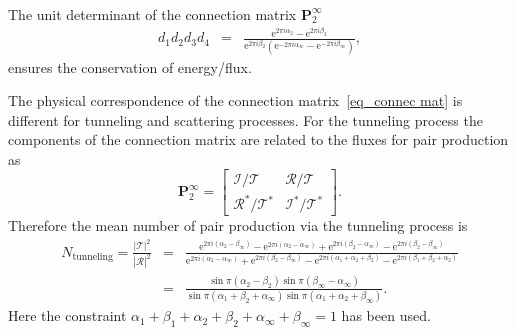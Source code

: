 \documentclass[aps,nofootinbib,superscriptaddress
]{revtex4}
\begin{document}
\begin{appendix}
\begin{eqnarray}
\end{eqnarray}
The unit determinant of the connection matrix $\mathbf{P}_2^\infty$
\begin{eqnarray}
d_1 d_2 d_3 d_4
&=& \frac{\mathrm{e}^{2 \pi i \alpha_2} - \mathrm{e}^{2 \pi i \beta_2}}{\mathrm{e}^{2 \pi i \beta_2} \left( \mathrm{e}^{- 2 \pi i \alpha_\infty} - \mathrm{e}^{- 2 \pi i \beta_\infty} \right)},
\end{eqnarray}
ensures the conservation of energy/flux.


The physical correspondence of the connection matrix~\eqref{eq_connec mat} is different for tunneling and scattering processes. For the tunneling process the components of the connection matrix are related to the fluxes for pair production as~\cite{Chen:2022hpe}
\begin{equation}
\mathbf{P}_2^\infty = \begin{bmatrix} \mathcal{I}/\mathcal{T} & \mathcal{R}/\mathcal{T} \\ \mathcal{R}^*/\mathcal{T}^* & \mathcal{I}^*/\mathcal{T}^* \end{bmatrix}.
\end{equation}
Therefore the mean number of pair production via the tunneling process is
\begin{eqnarray} \label{eq_Nt}
N_\textrm{tunneling} = \frac{|\mathcal{T}|^2}{|\mathcal{R}|^2} &=& \frac{\mathrm{e}^{2 \pi i (\alpha_2 - \beta_\infty)} - \mathrm{e}^{2 \pi i (\alpha_2 - \alpha_\infty)} + \mathrm{e}^{2 \pi i (\beta_2 - \alpha_\infty)} - \mathrm{e}^{2 \pi i (\beta_2 - \beta_\infty)}}{\mathrm{e}^{2 \pi i (\alpha_2 - \alpha_\infty)} + \mathrm{e}^{2 \pi i (\beta_2 - \beta_\infty)}  - \mathrm{e}^{2 \pi i (\alpha_1 + \alpha_2 + \beta_2)} - \mathrm{e}^{2 \pi i (\beta_1 + \beta_2 + \alpha_2)}} \nonumber\\
&=& \frac{\sin \pi (\alpha_2 - \beta_2) \sin \pi(\beta_\infty - \alpha_\infty)}{\sin \pi(\alpha_1 + \beta_2 + \alpha_\infty) \sin \pi(\alpha_1 + \alpha_2 + \beta_\infty)}.
\end{eqnarray}
Here the constraint $\alpha_1 + \beta_1 + \alpha_2 + \beta_2 + \alpha_\infty + \beta_\infty = 1$ has been used.



\end{appendix}
\end{document}
